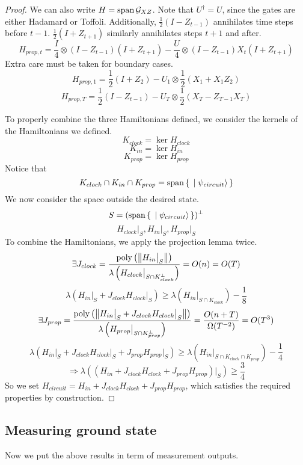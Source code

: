 \begin{proof}
We can also write $H=\operatorname*{\operatorname{span}}\mathcal{G}_{XZ}$. Note that $U^\dagger=U$, since the gates are either Hadamard or Toffoli. Additionally, $\frac{1}{2}(I-Z_{t-1})$ annihilates time steps before $t-1$. $\frac{1}{2}(I+Z_{t+1})$ similarly annihilates steps $t+1$ and after.
$$H_{prop,t}=\frac{I}{4}\otimes(I-Z_{t-1})(I+Z_{t+1})-\frac{U}{4}\otimes(I-Z_{t-1})X_t(I+Z_{t+1})$$
Extra care must be taken for boundary cases.
$$H_{prop,1}=\frac{1}{2}(I+Z_2)-U_1\otimes\frac{1}{2}(X_1+X_1Z_2)$$
$$H_{prop,T}=\frac{1}{2}(I-Z_{t-1})-U_T\otimes\frac{1}{2}(X_T-Z_{T-1}X_T)$$

To properly combine the three Hamiltonians defined, we consider the kernels of the Hamiltonians we defined.
$$K_{clock}=\ker H_{clock}$$
$$K_{in}=\ker H_{in}$$
$$K_{prop}=\ker H_{prop}$$
Notice that
$$K_{clock}\cap K_{in}\cap K_{prop}=\operatorname*{\operatorname{span}}\set{\ket{\psi_{circuit}}}$$
We now consider the space outside the desired state.
$$S=(\operatorname*{\operatorname{span}}\set{\ket{\psi_{circuit}}})^\bot$$
$$H_{clock}\big|_S,H_{in}\big|_S,H_{prop}\big|_S$$
To combine the Hamiltonians, we apply the projection lemma twice.
$$\exists J_{clock}
=\frac{\operatorname*{\operatorname{poly}}\left(\left\lVert H_{in}\big|_S\right\rVert\right)}{\lambda\left(H_{clock}\big|_{S\cap K^\bot_{clock}}\right)}
=O(n)=O(T)$$
$$\lambda(H_{in}\big|_S+J_{clock}H_{clock}\big|_S)\geq
\lambda(H_{in}\big|_{S\cap K_{clock}})-\frac{1}{8}$$
$$\exists J_{prop}=\frac{\operatorname*{\operatorname{poly}}\left(\left\lVert H_{in}\big|_S+J_{clock}H_{clock}\big|_S\right\rVert\right)}{\lambda\left(H_{prop}\big|_{S\cap K^\bot_{prop}}\right)}
=\frac{O(n+T)}{\Omega(T^{-2})}=O(T^3)$$
$$\lambda(H_{in}\big|_S+J_{clock}H_{clock}\big|_S+J_{prop}H_{prop}\big|_S)\geq
\lambda(H_{in}\big|_{S\cap K_{clock}\cap K_{prop}})-\frac{1}{4}$$
$$\Rightarrow\lambda((H_{in}+J_{clock}H_{clock}+J_{prop}H_{prop})\big|_S)\geq\frac{3}{4}$$
So we set $H_{circuit}=H_{in}+J_{clock}H_{clock}+J_{prop}H_{prop}$, which satisfies the required properties by construction.
\end{proof}

\subsection{Measuring ground state}

Now we put the above results in term of measurement outputs.

